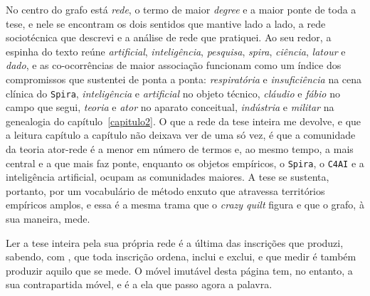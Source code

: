 No centro do grafo está \textit{rede}, o termo de maior \textit{degree} e a maior ponte de toda a tese, e nele se encontram os dois sentidos que mantive lado a lado, a rede sociotécnica que descrevi e a análise de rede que pratiquei. Ao seu redor, a espinha do texto reúne \textit{artificial}, \textit{inteligência}, \textit{pesquisa}, \textit{spira}, \textit{ciência}, \textit{latour} e \textit{dado}, e as co-ocorrências de maior associação funcionam como um índice dos compromissos que sustentei de ponta a ponta: \textit{respiratória} e \textit{insuficiência} na cena clínica do \texttt{Spira}, \textit{inteligência} e \textit{artificial} no objeto técnico, \textit{cláudio} e \textit{fábio} no campo que segui, \textit{teoria} e \textit{ator} no aparato conceitual, \textit{indústria} e \textit{militar} na genealogia do capítulo~\ref{capitulo2}. O que a rede da tese inteira me devolve, e que a leitura capítulo a capítulo não deixava ver de uma só vez, é que a comunidade da teoria ator-rede é a menor em número de termos e, ao mesmo tempo, a mais central e a que mais faz ponte, enquanto os objetos empíricos, o \texttt{Spira}, o \texttt{C4AI} e a inteligência artificial, ocupam as comunidades maiores. A tese se sustenta, portanto, por um vocabulário de método enxuto que atravessa territórios empíricos amplos, e essa é a mesma trama que o \textit{crazy quilt} figura e que o grafo, à sua maneira, mede.

Ler a tese inteira pela sua própria rede é a última das inscrições que produzi, sabendo, com \textcite{Law2004After}, que toda inscrição ordena, inclui e exclui, e que medir é também produzir aquilo que se mede. O móvel imutável desta página tem, no entanto, a sua contrapartida móvel, e é a ela que passo agora a palavra.

